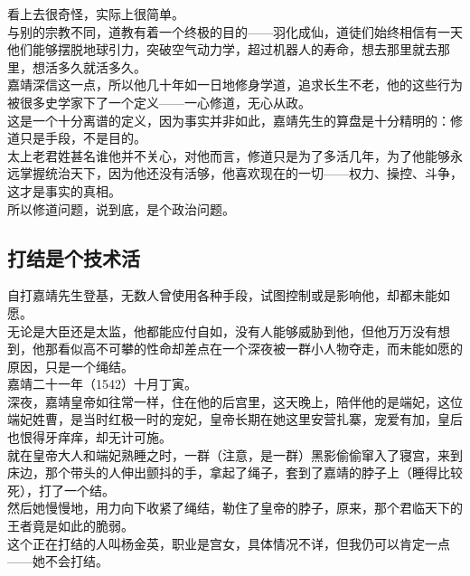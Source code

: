 \begin{multicols}{\theparacolNo}
看上去很奇怪，实际上很简单。\\

与别的宗教不同，道教有着一个终极的目的——羽化成仙，道徒们始终相信有一天他们能够摆脱地球引力，突破空气动力学，超过机器人的寿命，想去那里就去那里，想活多久就活多久。\\

嘉靖深信这一点，所以他几十年如一日地修身学道，追求长生不老，他的这些行为被很多史学家下了一个定义——一心修道，无心从政。\\

这是一个十分离谱的定义，因为事实并非如此，嘉靖先生的算盘是十分精明的：修道只是手段，不是目的。\\

太上老君姓甚名谁他并不关心，对他而言，修道只是为了多活几年，为了他能够永远掌握统治天下，因为他还没有活够，他喜欢现在的一切——权力、操控、斗争，这才是事实的真相。\\

所以修道问题，说到底，是个政治问题。\\

\subsection{打结是个技术活}
自打嘉靖先生登基，无数人曾使用各种手段，试图控制或是影响他，却都未能如愿。\\

无论是大臣还是太监，他都能应付自如，没有人能够威胁到他，但他万万没有想到，他那看似高不可攀的性命却差点在一个深夜被一群小人物夺走，而未能如愿的原因，只是一个绳结。\\

嘉靖二十一年（1542）十月丁寅。\\

深夜，嘉靖皇帝如往常一样，住在他的后宫里，这天晚上，陪伴他的是端妃，这位端妃姓曹，是当时红极一时的宠妃，皇帝长期在她这里安营扎寨，宠爱有加，皇后也恨得牙痒痒，却无计可施。\\

就在皇帝大人和端妃熟睡之时，一群（注意，是一群）黑影偷偷窜入了寝宫，来到床边，那个带头的人伸出颤抖的手，拿起了绳子，套到了嘉靖的脖子上（睡得比较死），打了一个结。\\

然后她慢慢地，用力向下收紧了绳结，勒住了皇帝的脖子，原来，那个君临天下的王者竟是如此的脆弱。\\

这个正在打结的人叫杨金英，职业是宫女，具体情况不详，但我仍可以肯定一点——她不会打结。\\


\end{multicols}
